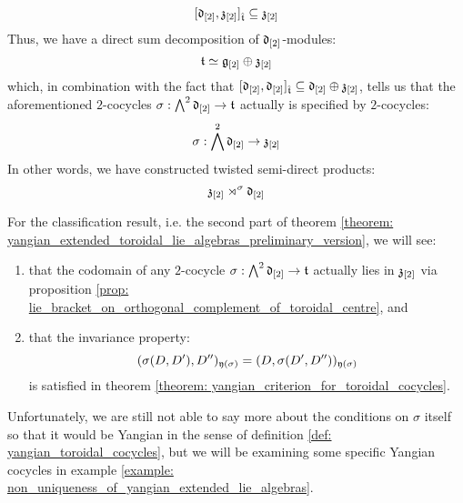 \begin{enumerate}
                $$[\mathfrak{d}_{[2]}, \mathfrak{z}_{[2]}]_{\hat{\mathfrak{t}}} \subseteq \mathfrak{z}_{[2]}$$
            Thus, we have a direct sum decomposition of $\mathfrak{d}_{[2]}$-modules:
                $$\mathfrak{t} \simeq \mathfrak{g}_{[2]} \oplus \mathfrak{z}_{[2]}$$
            which, in combination with the fact that $[\mathfrak{d}_{[2]}, \mathfrak{d}_{[2]}]_{\hat{\mathfrak{t}}} \subseteq \mathfrak{d}_{[2]} \oplus \mathfrak{z}_{[2]}$, tells us that the aforementioned $2$-cocycles $\sigma: \bigwedge^2 \mathfrak{d}_{[2]} \to \mathfrak{t}$ actually is specified by $2$-cocycles:
                $$\sigma: \bigwedge^2 \mathfrak{d}_{[2]} \to \mathfrak{z}_{[2]}$$
            In other words, we have constructed twisted semi-direct products:
                $$\mathfrak{z}_{[2]} \rtimes^{\sigma} \mathfrak{d}_{[2]}$$
        \end{enumerate}

        For the classification result, i.e. the second part of theorem \ref{theorem: yangian_extended_toroidal_lie_algebras_preliminary_version}, we will see:
        \begin{enumerate}
            \item that the codomain of any $2$-cocycle $\sigma: \bigwedge^2 \mathfrak{d}_{[2]} \to \mathfrak{t}$ actually lies in $\mathfrak{z}_{[2]}$ via proposition \ref{prop: lie_bracket_on_orthogonal_complement_of_toroidal_centre}, and
            \item that the invariance property:
                $$(\sigma(D, D'), D'')_{\mathfrak{y}(\sigma)} = (D, \sigma(D', D''))_{\mathfrak{y}(\sigma)}$$
            is satisfied in theorem \ref{theorem: yangian_criterion_for_toroidal_cocycles}.
        \end{enumerate}
        Unfortunately, we are still not able to say more about the conditions on $\sigma$ itself so that it would be Yangian in the sense of definition \ref{def: yangian_toroidal_cocycles}, but we will be examining some specific Yangian cocycles in example \ref{example: non_uniqueness_of_yangian_extended_lie_algebras}.